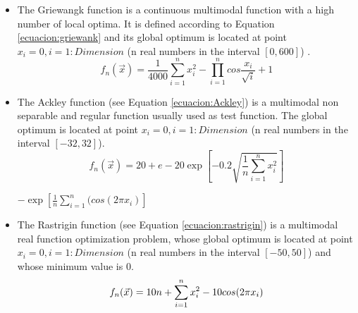 \documentclass[final,1p,times]{elsarticle}
\begin{document}
\begin{itemize}


\item The Griewangk function \cite{GRIE81} is a continuous multimodal function with a high number of local optima. It is defined according to Equation \ref{ecuacion:griewank} and its global optimum is located at point $x_{i}=0, i=1:Dimension$ (n real numbers in the interval $[0, 600]$) \cite{DBLP:journals/amc/ChoOG08}. 
\begin{equation}
 f_{n}(\vec{x}) = \frac{1}{4000} \sum_{i=1}^n x_{i}^2 - \prod_{i=1}^n cos \frac{x_{i}}{\sqrt{i}} + 1
\label{ecuacion:griewank}
\end{equation} 


\item The Ackley function \cite{funcs_ACK87,funcs_BAC96} (see Equation \ref{ecuacion:Ackley}) is a multimodal non separable and regular function usually used as test function. The global optimum is located at point $x_{i}=0, i=1:Dimension$ (n real numbers in the interval $[-32, 32]$).
\begin{equation}
f_{n}(\vec{x}) = 20+ e -20 \exp [-0.2\sqrt{\frac{1}{n} \sum_{i=1}^n x_{i}^2 } ]
\label{ecuacion:Ackley} 
\end{equation}

\begin{center}

$ - \exp [\frac{1}{n} \sum_{i=1}^n (cos(2 \pi x_{i})] $

\end{center}



\item The Rastrigin function \cite{TZ89} (see Equation \ref{ecuacion:rastrigin}) is a multimodal real function optimization problem,  whose global optimum is located at point $x_{i}=0, i=1:Dimension$ (n real numbers in the interval $[-50, 50]$) and whose minimum value is 0. 
\begin{equation}
 f_{n}(\vec{x}) = 10 n +\sum_{i=1}^n x_{i}^2 - 10 cos(2 \pi x_{i}) \\
\label{ecuacion:rastrigin}
\end{equation} 


\end{itemize}
\end{document}
